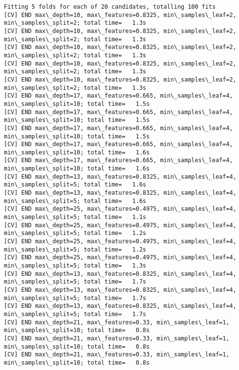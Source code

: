 \documentclass[11pt]{article}
\begin{document}
    \begin{Verbatim}[commandchars=\\\{\}]
Fitting 5 folds for each of 20 candidates, totalling 100 fits
[CV] END max\_depth=10, max\_features=0.8325, min\_samples\_leaf=2,
min\_samples\_split=2; total time=   1.3s
[CV] END max\_depth=10, max\_features=0.8325, min\_samples\_leaf=2,
min\_samples\_split=2; total time=   1.3s
[CV] END max\_depth=10, max\_features=0.8325, min\_samples\_leaf=2,
min\_samples\_split=2; total time=   1.3s
[CV] END max\_depth=10, max\_features=0.8325, min\_samples\_leaf=2,
min\_samples\_split=2; total time=   1.3s
[CV] END max\_depth=10, max\_features=0.8325, min\_samples\_leaf=2,
min\_samples\_split=2; total time=   1.3s
[CV] END max\_depth=17, max\_features=0.665, min\_samples\_leaf=4,
min\_samples\_split=10; total time=   1.5s
[CV] END max\_depth=17, max\_features=0.665, min\_samples\_leaf=4,
min\_samples\_split=10; total time=   1.5s
[CV] END max\_depth=17, max\_features=0.665, min\_samples\_leaf=4,
min\_samples\_split=10; total time=   1.5s
[CV] END max\_depth=17, max\_features=0.665, min\_samples\_leaf=4,
min\_samples\_split=10; total time=   1.6s
[CV] END max\_depth=17, max\_features=0.665, min\_samples\_leaf=4,
min\_samples\_split=10; total time=   1.6s
[CV] END max\_depth=13, max\_features=0.8325, min\_samples\_leaf=4,
min\_samples\_split=5; total time=   1.6s
[CV] END max\_depth=13, max\_features=0.8325, min\_samples\_leaf=4,
min\_samples\_split=5; total time=   1.6s
[CV] END max\_depth=25, max\_features=0.4975, min\_samples\_leaf=4,
min\_samples\_split=5; total time=   1.1s
[CV] END max\_depth=25, max\_features=0.4975, min\_samples\_leaf=4,
min\_samples\_split=5; total time=   1.2s
[CV] END max\_depth=25, max\_features=0.4975, min\_samples\_leaf=4,
min\_samples\_split=5; total time=   1.2s
[CV] END max\_depth=25, max\_features=0.4975, min\_samples\_leaf=4,
min\_samples\_split=5; total time=   1.3s
[CV] END max\_depth=13, max\_features=0.8325, min\_samples\_leaf=4,
min\_samples\_split=5; total time=   1.7s
[CV] END max\_depth=13, max\_features=0.8325, min\_samples\_leaf=4,
min\_samples\_split=5; total time=   1.7s
[CV] END max\_depth=13, max\_features=0.8325, min\_samples\_leaf=4,
min\_samples\_split=5; total time=   1.7s
[CV] END max\_depth=21, max\_features=0.33, min\_samples\_leaf=1,
min\_samples\_split=10; total time=   0.8s
[CV] END max\_depth=21, max\_features=0.33, min\_samples\_leaf=1,
min\_samples\_split=10; total time=   0.8s
[CV] END max\_depth=21, max\_features=0.33, min\_samples\_leaf=1,
min\_samples\_split=10; total time=   0.8s

\end{Verbatim}
\end{document}
